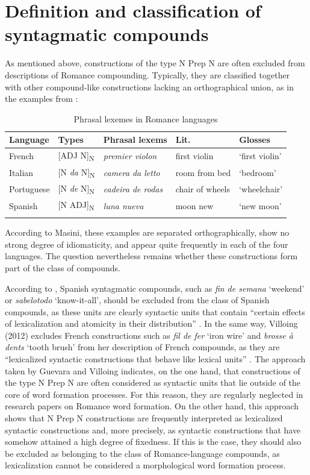 \documentclass[output=paper]{langsci/langscibook}
\begin{document}
\section{Definition and classification of syntagmatic compounds} 

As mentioned above, constructions of the type N Prep N are often excluded from descriptions of Romance compounding.  Typically, they are classified together with other compound-like constructions lacking an orthographical union, as in the examples from \citep[257]{Masini:2009}: 

\begin{table}
\caption{Phrasal lexemes in Romance languages }
\label{Fig:1:Types of phrasal lexemes}
\begin{tabular}{lllll}
\lsptoprule 
Language & Types & Phrasal lexems & Lit. & Glosses\\ 
\midrule
French & [ADJ N]\textsubscript{N} & \textit{premier violon} & first violin & `first violin' \\  
Italian & [N \textit{da} N]\textsubscript{N} & \textit{camera da letto} & room from bed & `bedroom' \\  
Portuguese & [N \textit{de} N]\textsubscript{N} & \textit{cadeira de rodas} & chair of wheels & `wheelchair' \\  
Spanish & [N ADJ]\textsubscript{N} & \textit{luna nueva} & moon new & `new moon' \\ 
\lspbottomrule
\end{tabular} 
\end{table}

According to Masini, these examples are separated orthographically, show no strong degree of idiomaticity, and appear quite frequently in each of the four languages. The question nevertheless remains whether these constructions form part of the class of compounds.

According to \citet{Guevara:2012}, Spanish syntagmatic compounds, such as \textit{fin de semana} `weekend' or \textit{sabelotodo} `know-it-all', should be excluded from the class of Spanish compounds, as these units are clearly syntactic units that contain “certain effects of lexicalization and atomicity in their distribution” \citep[180]{Guevara:2012}. In the same way, Villoing (2012) excludes French constructions such as \textit {fil de fer} `iron wire' and \textit {brosse à dents} `tooth brush' from her description of French compounds, as they are “lexicalized syntactic constructions that behave like lexical units” \citep[35]{Villoing:2012}. The approach taken by Guevara and Villoing indicates, on the one hand, that constructions of the type N Prep N are often considered as syntactic units that lie outside of the core of word formation processes. For this reason, they are regularly neglected in research papers on Romance word formation. On the other hand, this approach shows that N Prep N constructions are frequently interpreted as lexicalized syntactic constructions and, more precisely, as syntactic constructions that have somehow attained a high degree of fixedness. If this is the case, they should also be excluded as belonging to the class of Romance-language compounds, as lexicalization cannot be considered a morphological word formation process.
\end{document}
